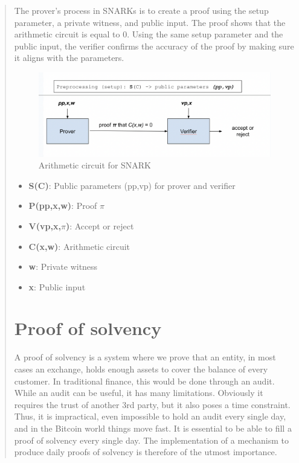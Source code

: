\begin{quote}
The prover's process in SNARKs is to create a proof using the setup parameter, a private witness, and public input. The proof shows that the arithmetic circuit is equal to 0.
Using the same setup parameter and the public input, the verifier confirms the accuracy of the proof by making sure it aligns with the parameters.

\begin{figure}[H]
   \centering
   \includegraphics[width=130mm]{Circuit.png}
   \caption{Arithmetic circuit for SNARK \cite{ZKM2}}
   \label{overflow}
   \end{figure}


\begin{itemize}
\item \textbf{S(C)}: Public parameters (pp,vp) for prover and verifier
\item \textbf{P(pp,x,w)}: Proof $\pi$
\item \textbf{V(vp,x,$\pi$)}: Accept or reject
\item \textbf{C(x,w)}: Arithmetic circuit
\item \textbf{w}: Private witness
\item \textbf{x}: Public input
\end{itemize}
\fi

\section{Proof of solvency}

A proof of solvency is a system where we prove that an entity, in most cases an exchange, holds enough assets to cover
the balance of every customer. In traditional finance, this would be done through an audit. While an audit can be useful,
it has many limitations. Obviously it requires the trust of another 3rd party, but it also poses a time constraint. Thus, it is impractical, even impossible
to hold an audit every single day, and in the Bitcoin world things move fast. It is essential to be able to fill a proof of solvency every single day.
The implementation of a mechanism to produce daily proofs of solvency is therefore of the utmost importance.


\end{quote}
